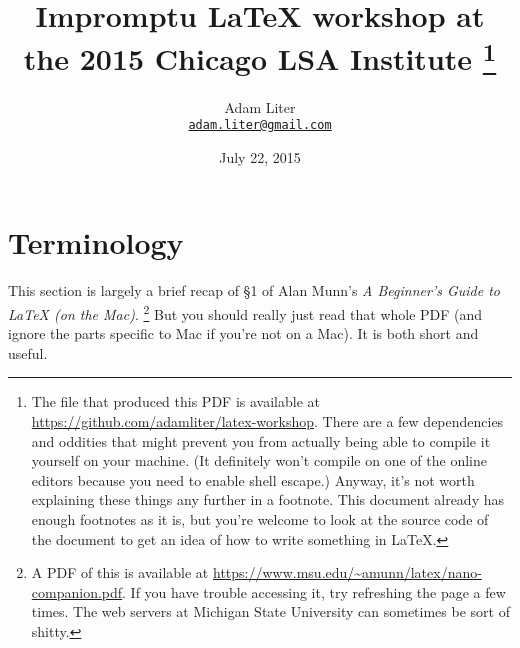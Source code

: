 \documentclass{article}
\title{Impromptu \LaTeX{} workshop at the 2015 Chicago LSA Institute%
\thanks{The \File{.tex} file that produced this PDF is available at \url{https://github.com/adamliter/latex-workshop}.
There are a few dependencies and oddities that might prevent you from actually being able to compile it yourself on your machine.
(It definitely won't compile on one of the online editors because you need to enable shell escape.)
Anyway, it's not worth explaining these things any further in a footnote.
This document already has enough footnotes as it is, but you're welcome to look at the source code of the document to get an idea of how to write something in \LaTeX.
}
}
\author{\begin{tabular}{cc}Adam Liter\\\href{mailto:adam.liter@gmail.com}{\nolinkurl{adam.liter@gmail.com}}\end{tabular}}
\date{July 22, 2015}
\newcommand*{\TitleText}[1]{\textit{#1}}
\begin{document}
\maketitle

\section{Terminology}
\label{sec:terminology}

This section is largely a brief recap of \S1 of Alan Munn's \TitleText{A Beginner's Guide to \LaTeX{} (on the Mac)}.%
\footnote{%
A PDF of this is available at \url{https://www.msu.edu/~amunn/latex/nano-companion.pdf}.
If you have trouble accessing it, try refreshing the page a few times. The web servers at Michigan State University can sometimes be sort of shitty.
}
But you should really just read that whole PDF (and ignore the parts specific to Mac if you're not on a Mac).
It is both short and useful.
\end{document}
